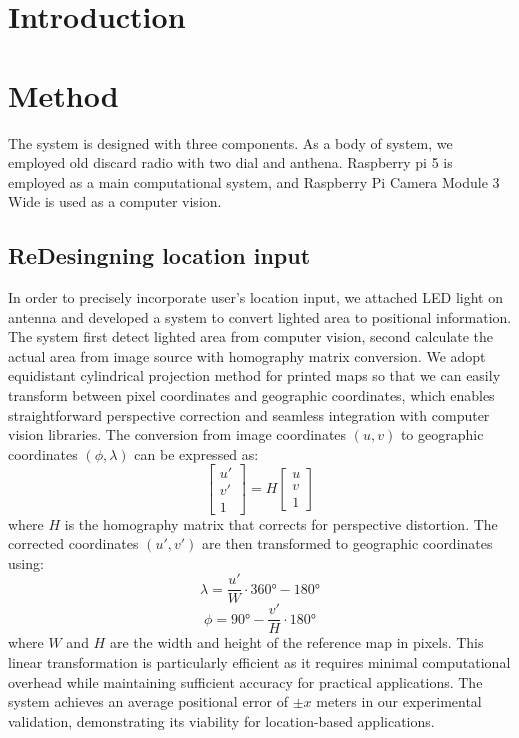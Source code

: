 \documentclass[sigconf,authordraft]{acmart}
\begin{document}
\maketitle

\section{Introduction}


\section{Method}
The system is designed with three components. As a body of system, we employed old discard radio with two dial and anthena. Raspberry pi 5 is employed as a main computational system, and Raspberry Pi Camera Module 3 Wide is used as a computer vision. 
\subsection{ReDesingning location input}
In order to precisely incorporate user's location input, we attached LED light on antenna and developed a system to convert lighted area to positional information. The system first detect lighted area from computer vision, second calculate the actual area from image source with homography matrix conversion. We adopt equidistant cylindrical projection method for printed maps so that we can easily transform between pixel coordinates and geographic coordinates, which enables straightforward perspective correction and seamless integration with computer vision libraries.
The conversion from image coordinates $(u,v)$ to geographic coordinates $(\phi,\lambda)$ can be expressed as:
\begin{equation}
\begin{bmatrix} u' \\ v' \\ 1 \end{bmatrix} = 
H \begin{bmatrix} u \\ v \\ 1 \end{bmatrix}
\end{equation}
where $H$ is the homography matrix that corrects for perspective distortion. The corrected coordinates $(u',v')$ are then transformed to geographic coordinates using:
\begin{equation}
\lambda = \frac{u'}{W} \cdot 360° - 180°
\end{equation}
\begin{equation}
\phi = 90° - \frac{v'}{H} \cdot 180°
\end{equation}
where $W$ and $H$ are the width and height of the reference map in pixels. This linear transformation is particularly efficient as it requires minimal computational overhead while maintaining sufficient accuracy for practical applications. The system achieves an average positional error of $\pm x$ meters in our experimental validation, demonstrating its viability for location-based applications.
\end{document}
